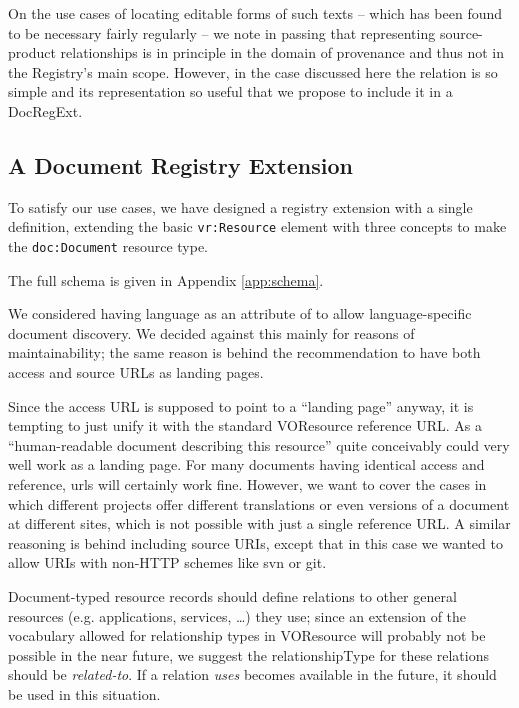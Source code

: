 \documentclass{ivoa}
\begin{document}
On the use cases of locating editable forms of such texts – which
has been found to be necessary fairly regularly – we note in passing
that representing source-product relationships is in principle in the
domain of provenance and thus not in the Registry's main scope. However, in
the case discussed here the relation is so simple and its representation
so useful that we propose to include it in a DocRegExt.


\subsection{A Document Registry Extension}

\label{sect:regext-ext}

To satisfy our use cases, we have designed a registry extension with
a single definition, extending the basic \texttt{vr:Resource}
element with three concepts to make the \texttt{doc:Document}
resource type.

The full schema is given in Appendix \ref{app:schema}.

We considered  having language as an attribute of  to allow
language-specific document discovery.  We decided against this mainly
for reasons of maintainability; the same reason is behind the
recommendation to have both access and source URLs as landing pages.

Since the access URL is supposed to point to a ``landing page'' anyway,
it is tempting to just unify it with the standard VOResource reference
URL. As a ``human-readable document describing this resource''
\citep{2008ivoa.spec.0222P} quite conceivably could very well work as a landing
page.  For many documents having identical access and reference, urls
will certainly work fine.  However, we want to cover the cases in
which different projects offer different translations or even versions
of a document at different sites, which is not possible with just a
single reference URL.  A similar reasoning is behind including source
URIs, except that in this case we wanted to allow URIs with non-HTTP
schemes like svn or git.

Document-typed resource records should define relations to other
general resources (e.g. applications, services, \dots) 
they use; since an extension of the vocabulary allowed for relationship types
in VOResource will probably not be possible in the near future,
we suggest the relationshipType for these relations should be
\emph{related-to}.  If a relation \emph{uses} becomes available
in the future, it should be used in this situation.
\end{document}
